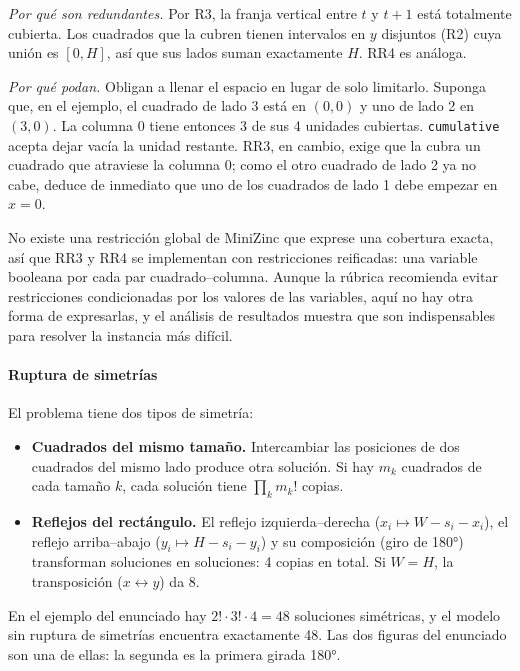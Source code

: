 \textit{Por qué son redundantes.} Por R3, la franja vertical entre $t$ y $t + 1$ está totalmente cubierta. Los cuadrados que la cubren tienen intervalos en $y$ disjuntos (R2) cuya unión es $[0, H]$, así que sus lados suman exactamente $H$. RR4 es análoga.

\textit{Por qué podan.} Obligan a llenar el espacio en lugar de solo limitarlo. Suponga que, en el ejemplo, el cuadrado de lado 3 está en $(0, 0)$ y uno de lado 2 en $(3, 0)$. La columna 0 tiene entonces 3 de sus 4 unidades cubiertas. \texttt{cumulative} acepta dejar vacía la unidad restante. RR3, en cambio, exige que la cubra un cuadrado que atraviese la columna 0; como el otro cuadrado de lado 2 ya no cabe, deduce de inmediato que uno de los cuadrados de lado 1 debe empezar en $x = 0$.

No existe una restricción global de MiniZinc que exprese una cobertura exacta, así que RR3 y RR4 se implementan con restricciones reificadas: una variable booleana por cada par cuadrado--columna. Aunque la rúbrica recomienda evitar restricciones condicionadas por los valores de las variables, aquí no hay otra forma de expresarlas, y el análisis de resultados muestra que son indispensables para resolver la instancia más difícil.

\paragraph{Ruptura de simetrías}

El problema tiene dos tipos de simetría:

\begin{itemize}
    \item \textbf{Cuadrados del mismo tamaño.} Intercambiar las posiciones de dos cuadrados del mismo lado produce otra solución. Si hay $m_k$ cuadrados de cada tamaño $k$, cada solución tiene $\prod_k m_k!$ copias.
    \item \textbf{Reflejos del rectángulo.} El reflejo izquierda--derecha ($x_i \mapsto W - s_i - x_i$), el reflejo arriba--abajo ($y_i \mapsto H - s_i - y_i$) y su composición (giro de 180°) transforman soluciones en soluciones: 4 copias en total. Si $W = H$, la transposición ($x \leftrightarrow y$) da 8.
\end{itemize}

En el ejemplo del enunciado hay $2! \cdot 3! \cdot 4 = 48$ soluciones simétricas, y el modelo sin ruptura de simetrías encuentra exactamente 48. Las dos figuras del enunciado son una de ellas: la segunda es la primera girada 180°.

